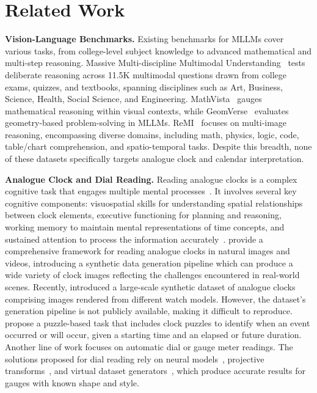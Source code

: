 \section{Related Work}
\label{sec:related}
% 
\textbf{Vision-Language Benchmarks.} Existing benchmarks for MLLMs cover various tasks, from college-level subject knowledge to advanced mathematical and multi-step reasoning.
%
Massive Multi-discipline Multimodal Understanding~\cite[MMMU, ][]{Yue_2024_CVPR} tests deliberate reasoning across 11.5K multimodal questions drawn from college exams, quizzes, and textbooks, spanning disciplines such as Art, Business, Science, Health, Social Science, and Engineering.
%
MathVista~\cite{lu2024mathvista} gauges mathematical reasoning within visual contexts, while GeomVerse~\cite{kazemi2024geomverse} evaluates geometry-based problem-solving in MLLMs.
%
ReMI~\cite{kazemi2024remi} focuses on multi-image reasoning, encompassing diverse domains, including math, physics, logic, code, table/chart comprehension, and spatio-temporal tasks.
%
Despite this breadth, none of these datasets specifically targets analogue clock and calendar interpretation.
%

\textbf{Analogue Clock and Dial Reading.}
%
Reading analogue clocks is a complex cognitive task that engages multiple mental processes~\cite{DBLP:journals/corr/abs-2410-11756}.
%
It involves several key cognitive components: visuospatial skills for understanding spatial relationships between clock elements, executive functioning for planning and reasoning, working memory to maintain mental representations of time concepts, and sustained attention to process the information accurately~\cite{DBLP:journals/corr/abs-2410-11756,5673a1d18644461d895f9b7c6ecfe2e1}.
%
\citet{yang2022its} provide a comprehensive framework for reading analogue clocks in natural images and videos, introducing a synthetic data generation pipeline which can produce a wide variety of clock images reflecting the challenges encountered in real-world scenes.
% 
Recently, \citet{deitke2024molmopixmoopenweights} introduced a large-scale synthetic dataset of analogue clocks comprising images rendered from different watch models.  However, the dataset's generation pipeline is not publicly available, making it difficult to reproduce.
% 
\citet{ghosal2024languagemodelspuzzleprodigies} propose a puzzle-based task that includes clock puzzles to identify when an event occurred or will occur, given a starting time and an elapsed or future duration. 
%
Another line of work focuses on automatic dial or gauge meter readings.
%
The solutions proposed for dial reading rely on neural models~\cite{Alexeev20}, projective transforms~\cite{bao19}, and virtual dataset generators~\cite{cai20, Howells_2021_CVPR}, which produce accurate results for gauges with known shape and style.
%
%